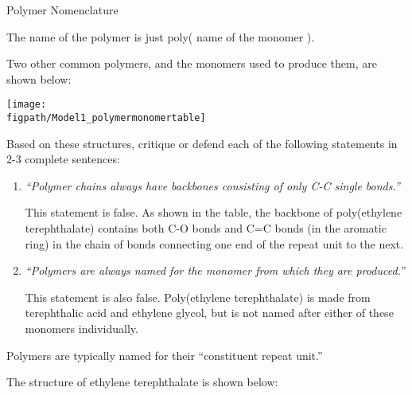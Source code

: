 \begin{activity}{Polymer Nomenclature}
\begin{ctqs}
\begin{enumerate}
				\begin{solution}[0.75in]{}
				
					The name of the polymer is just poly( name of the monomer ).
					
				\end{solution}
				
		\end{enumerate}
		
	\question Two other common polymers, and the monomers used to produce them, are shown below:
	
		\centerline{\texttt{[image: \\figpath/Model1\_polymermonomertable]}}
		
		Based on these structures, critique or defend each of the following statements in 2-3 complete sentences:
		
		\begin{enumerate}
			\item \emph{``Polymer chains always have backbones consisting of only C-C single bonds.''}
			
				\begin{solution}[1.5in]{}
					This statement is false.  As shown in the table, the backbone of poly(ethylene terephthalate) contains both C-O bonds and C=C bonds (in the aromatic ring) in the chain of bonds connecting one end of the repeat unit to the next.
				\end{solution}
			
			\item \emph{``Polymers are always named for the monomer from which they are produced.''}
			
				\begin{solution}[1.5in]{}
					This statement is also false.  Poly(ethylene terephthalate) is made from terephthalic acid and ethylene glycol, but is not named after either of these monomers individually.
				\end{solution}
			
		\end{enumerate}

\end{ctqs}

\begin{infobox}
	Polymers are typically named for their ``constituent repeat unit.''
\end{infobox}

\begin{ctqs}

	\question The structure of ethylene terephthalate is shown below:
	

\end{ctqs}
\end{activity}
